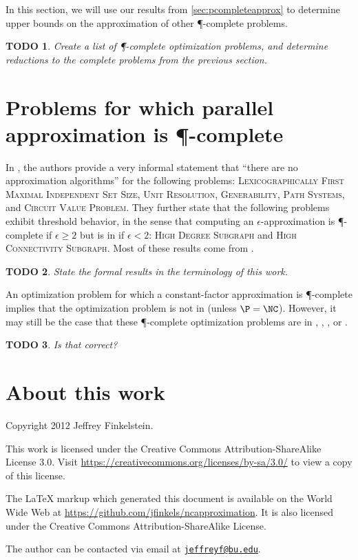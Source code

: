 \documentclass[]{article}
\theoremstyle{plain}
\newtheorem{todo}{TODO}
\theoremstyle{definition}
\newcommand{\email}[1]{\href{mailto:#1}{\nolinkurl{#1}}}
\begin{document}
In this section, we will use our results from \autoref{sec:pcompleteapprox} to determine upper bounds on the approximation of other \P-complete problems.

\begin{todo}
  Create a list of \P-complete optimization problems, and determine reductions to the complete problems from the previous section.
\end{todo}

\section{Problems for which parallel approximation is \texorpdfstring{\P}{P}-complete}
\label{sec:approximationispcomplete}

In \cite[Section~10.2]{ghr95}, the authors provide a very informal statement that ``there are no \NC{} approximation algorithms'' for the following problems: \textsc{Lexicographically First Maximal Independent Set Size}, \textsc{Unit Resolution}, \textsc{Generability}, \textsc{Path Systems}, and \textsc{Circuit Value Problem}.
They further state that the following problems exhibit threshold behavior, in the sense that computing an $\epsilon$-approximation is \P-complete if $\epsilon\geq 2$ but is in \NCAS{} if $\epsilon<2$: \textsc{High Degree Subgraph} and \textsc{High Connectivity Subgraph}.
Most of these results come from \cite{ss89}.

\begin{todo}
  State the formal results in the terminology of this work.
\end{todo}

An optimization problem for which a constant-factor approximation is \P-complete implies that the optimization problem is not in \ApxNCO{} (unless $\P=\NC$).
However, it may still be the case that these \P-complete optimization problems are in \logApxNCO, \polyApxNCO, \expApxNCO, or \NNCO.

\begin{todo}
  Is that correct?
\end{todo}

\section{About this work}

Copyright 2012 Jef{}frey Finkelstein.

This work is licensed under the Creative Commons Attribution-ShareAlike License 3.0.
Visit \mbox{\url{https://creativecommons.org/licenses/by-sa/3.0/}} to view a copy of this license.

The \LaTeX{} markup which generated this document is available on the World Wide Web at \mbox{\url{https://github.com/jfinkels/ncapproximation}}.
It is also licensed under the Creative Commons Attribution-ShareAlike License.

The author can be contacted via email at \email{jeffreyf@bu.edu}.



\end{document}
